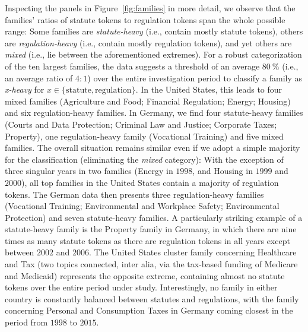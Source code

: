 \documentclass[utf8,sort&compress,table,hidelinks]{frontiersFPHY} %
\begin{document}
Inspecting the panels in Figure~\ref{fig:families} in more detail, we observe that the families' ratios of statute tokens to regulation tokens span the whole possible range: 
Some families are \emph{statute-heavy} (i.e., contain mostly statute tokens), 
others are \emph{regulation-heavy} (i.e., contain mostly regulation tokens),
and yet others are \emph{mixed} (i.e., lie between the aforementioned extremes).
For a robust categorization of the ten largest families, the data suggests a threshold of an average $80~\%$ (i.e., an average ratio of $4:1$) over the entire investigation period to classify a family as \emph{x-heavy} for $x\in\{\text{statute}, \text{regulation}\}$.
In the United States, this leads to four mixed families (Agriculture and Food; Financial Regulation; Energy; Housing) and six regulation-heavy families.
In Germany, we find four statute-heavy families (Courts and Data Protection; Criminal Law and Justice; Corporate Taxes; Property), one regulation-heavy family (Vocational Training) and five mixed families.
The overall situation remains similar even if we adopt a simple majority for the classification (eliminating the \emph{mixed} category): 
With the exception of three singular years in two families (Energy in $1998$, and Housing in $1999$ and $2000$), all top families in the United States contain a majority of regulation tokens.
The German data then presents three regulation-heavy families (Vocational Training; Environmental and Workplace Safety; Environmental Protection) and seven statute-heavy families.
A particularly striking example of a statute-heavy family is the Property family in Germany, in which there are nine times as many statute tokens as there are regulation tokens in all years except between $2002$ and $2006$.
The United States cluster family concerning Healthcare and Tax (two topics connected, inter alia, via the tax-based funding of Medicare and Medicaid) represents the opposite extreme, containing almost no statute tokens over the entire period under study.
Interestingly, no family in either country is constantly balanced between statutes and regulations, with the family concerning Personal and Consumption Taxes in Germany coming closest in the period from $1998$ to $2015$.
\end{document}
